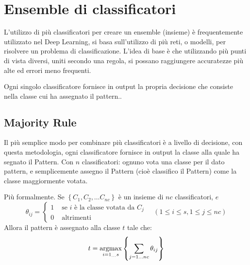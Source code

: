 \chapter{Ensemble di classificatori}\label{ensemble-di-classificatori}

L'utilizzo di più classificatori per creare un ensemble (insieme) è frequentemente utilizzato nel Deep Learning, si basa sull’utilizzo di più
reti, o modelli, per risolvere un problema di classificazione. L’idea di base è che utilizzando più punti di vista diversi, uniti secondo una regola, si possano raggiungere accuratezze
più alte ed errori meno frequenti.

Ogni singolo classificatore fornisce in output la propria decisione che consiste nella classe cui
ha assegnato il pattern.\cite{unibo_maltoni_ml}\cite{zhi_enseble}. 

\section{Majority Rule}\label{majority-rule}

Il più semplice modo per combinare più classificatori è a livello
di decisione, con questa metodologia, ogni classificatore fornisce in output la classe alla quale ha segnato il Pattern.  Con \(n\) classificatori: ognuno vota una classe per il dato
pattern, e semplicemente  assegno il Pattern (cioè classifico il Pattern) come la classe maggiormente votata.

Più formalmente.
Se \( \left\{C_{1}, C_{2}, \ldots C_{n c}\right\} \) è un insieme di \( n c \) classificatori, \( e \)
\[
\theta_{i j}=\left\{\begin{array}{cc}
1 & \text { se } i \text { è la classe votata da } C_{j} \\
0 & \text { altrimenti }
\end{array} \quad(1 \leq i \leq s, 1 \leq j \leq n c)\right.
\]
Allora il pattern è assegnato alla classe \( t \) tale che:
\[
t=\operatornamewithlimits{argmax} _{i=1_{\ldots} s}\left\{\sum_{j=1 \ldots n c} \theta_{i j}\right\}
\]